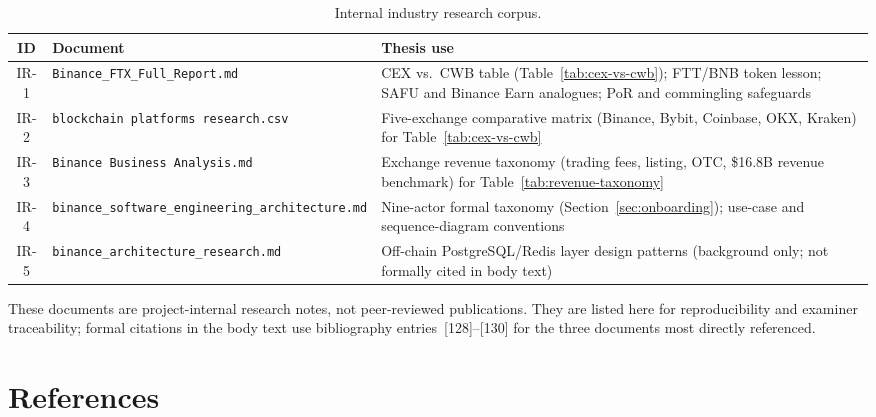 \documentclass[12pt,a4paper]{report}
\newcommand{\tableheadcolor}{\rowcolor{TableHeadBg}}
\begin{document}
\begin{table}[H]
\centering
\caption[Internal industry research corpus]{Internal industry research corpus.}
\label{tab:internal-research}
\begin{tabular}{@{}clp{7.5cm}@{}}
\toprule
\tableheadcolor
\textbf{ID} & \textbf{Document} & \textbf{Thesis use} \\
\midrule
IR-1 & \texttt{Binance\_FTX\_Full\_Report.md} & CEX vs.\ CWB table (Table~\ref{tab:cex-vs-cwb}); FTT/BNB token lesson; SAFU and Binance Earn analogues; PoR and commingling safeguards \\
IR-2 & \texttt{blockchain platforms research.csv} & Five-exchange comparative matrix (Binance, Bybit, Coinbase, OKX, Kraken) for Table~\ref{tab:cex-vs-cwb} \\
IR-3 & \texttt{Binance Business Analysis.md} & Exchange revenue taxonomy (trading fees, listing, OTC, \$16.8B revenue benchmark) for Table~\ref{tab:revenue-taxonomy} \\
IR-4 & \texttt{binance\_software\_engineering\_architecture.md} & Nine-actor formal taxonomy (Section~\ref{sec:onboarding}); use-case and sequence-diagram conventions \\
IR-5 & \texttt{binance\_architecture\_research.md} & Off-chain PostgreSQL/Redis layer design patterns (background only; not formally cited in body text) \\
\bottomrule
\end{tabular}
\end{table}

\noindent These documents are project-internal research notes, not peer-reviewed publications. They are listed here for reproducibility and examiner traceability; formal citations in the body text use bibliography entries~[128]--[130] for the three documents most directly referenced.

\chapter*{References}
{}
\end{document}
